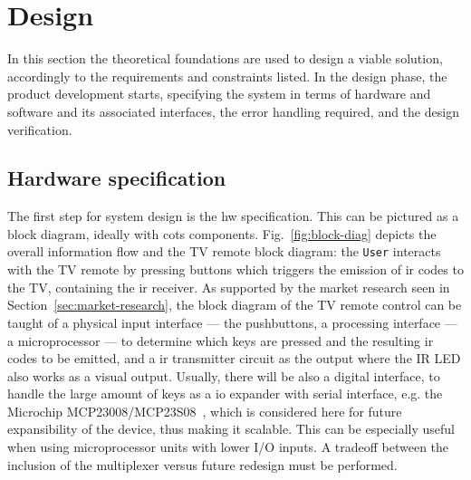 \chapter{Design}
\label{ch:design}
In this section the theoretical foundations are used to design a viable
solution, accordingly to the requirements and constraints listed.
In the design phase, the product development starts, specifying the system in
terms of hardware and software and its associated interfaces, the error handling
required, and the design verification.
%
  \vspace{-5mm}
%  
\section{Hardware specification}
\label{sec:hw-specs}
The first step for system design is the \gls{hw} specification. This can be
pictured as a block diagram, ideally with \gls{cots}
components. Fig.~\ref{fig:block-diag} depicts the overall information flow and
the TV remote block diagram: the \texttt{User} interacts with
the TV remote by pressing buttons which triggers the emission of \gls{ir} codes
to the TV, containing the \gls{ir} receiver. As supported by the market research
seen in
Section~\ref{sec:market-research}, the block diagram of the TV remote control
can be taught of a physical input interface --- the pushbuttons, a processing
interface --- a microprocessor --- to determine which keys are pressed and the
resulting \gls{ir} codes to be emitted, and a \gls{ir} transmitter circuit as
the output where the IR LED also works as a visual output. Usually, there will
be also a digital interface, to handle the large amount of keys as a
\gls{io} expander with serial interface, e.g. the Microchip MCP23008/MCP23S08~\cite{microchip}, which is considered here for future expansibility of the device,
thus making it scalable. This can be especially useful when using
microprocessor units with lower I/O inputs. A tradeoff between the inclusion of
the multiplexer versus future redesign must be performed.


